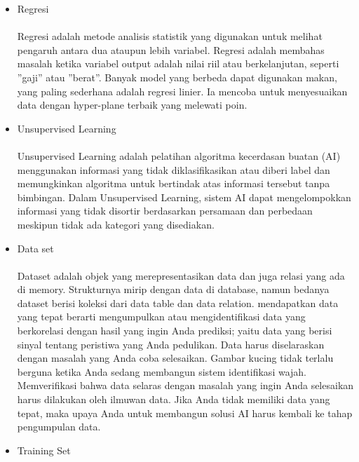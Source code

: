 \begin{enumerate}
\begin{itemize}
			\item Regresi
				\paragraph{}
				Regresi adalah metode analisis statistik yang digunakan untuk melihat pengaruh antara dua ataupun lebih variabel. Regresi adalah membahas masalah ketika variabel output adalah nilai riil atau berkelanjutan, seperti ”gaji” atau ”berat”. Banyak model yang berbeda dapat digunakan makan, yang paling sederhana adalah regresi linier. Ia mencoba untuk menyesuaikan data dengan hyper-plane terbaik yang melewati poin.
				
			\item Unsupervised Learning
				\paragraph{}
				Unsupervised Learning adalah pelatihan algoritma kecerdasan buatan (AI) menggunakan informasi yang tidak diklasifikasikan atau diberi label dan memungkinkan algoritma untuk bertindak atas informasi tersebut tanpa bimbingan. Dalam Unsupervised Learning, sistem AI dapat mengelompokkan informasi yang tidak disortir berdasarkan persamaan dan perbedaan meskipun tidak ada kategori yang disediakan.
				
			\item Data set
				\paragraph{}
				Dataset adalah objek yang merepresentasikan data dan juga relasi yang ada di memory. Strukturnya mirip dengan data di database, namun bedanya dataset berisi koleksi dari data table dan data relation. mendapatkan data yang tepat berarti mengumpulkan atau mengidentifikasi data yang berkorelasi dengan hasil yang ingin Anda prediksi; yaitu data yang berisi sinyal tentang peristiwa yang Anda pedulikan. Data harus diselaraskan dengan masalah yang Anda coba selesaikan. Gambar kucing tidak terlalu berguna ketika Anda sedang membangun sistem identifikasi wajah. Memverifikasi bahwa data selaras dengan masalah yang ingin Anda selesaikan harus dilakukan oleh ilmuwan data. Jika Anda tidak memiliki data yang tepat, maka upaya Anda untuk membangun solusi AI harus kembali ke tahap pengumpulan data.

			\item Training Set

\end{itemize}
\end{enumerate}
